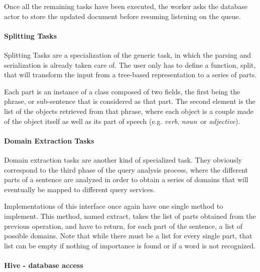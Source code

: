 Once all the remaining tasks have been executed, the worker asks the database actor to store the updated document before resuming listening on the queue.


\paragraph{Splitting Tasks} %
\label{par:splitting_tasks}

Splitting Tasks are a specialization of the generic task, in which the parsing and serialization is already taken care of. The user only has to define a function, split, that will transform the input from a tree-based representation to a series of parts.

Each part is an instance of a class composed of two fields, the first being the phrase, or sub-sentence that is considered as that part. The second element is the list of the objects retrieved from that phrase, where each object is a couple made of the object itself as well as its part of speech (e.g. \emph{verb}, \emph{noun}\ or \emph{adjective}).


\paragraph{Domain Extraction Tasks} %
\label{par:domain_extraction_tasks}

Domain extraction tasks are another kind of specialized task. They obviously correspond to the third phase of the query analysis process, where the different parts of a sentence are analyzed in order to obtain a series of domains that will eventually be mapped to different query services.

Implementations of this interface once again have one single method to implement. This method, named extract, takes the list of parts obtained from the previous operation, and have to return, for each part of the sentence, a list of possible domains. Note that while there must be a list for every single part, that list can be empty if nothing of importance is found or if a word is not recognized.



\paragraph{Hive - database access} %
\label{par:hive_database_access}

